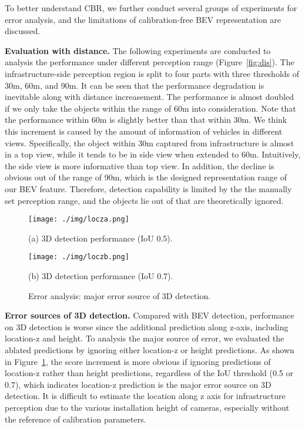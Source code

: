 \documentclass[letterpaper, 10 pt, conference]{ieeeconf}
\begin{document}
To better understand CBR, we further conduct several groups of experiments for error analysis, and the limitations of calibration-free BEV representation are discussed.

\textbf{Evaluation with distance.}
The following experiments are conducted to analysis the performance under different perception range (Figure~\ref{fig:dis}). The infrastructure-side perception region is split to four parts with three thresholds of 30m, 60m, and 90m. It can be seen that the performance degradation is inevitable along with distance increasement. The performance is almost doubled if we only take the objects within the range of 60m into consideration. Note that the performance within 60m is slightly better than that within 30m. We think this increment is caused by the amount of information of vehicles in different views. Specifically, the object within 30m captured from infrastructure is almost in a top view, while it tends to be in side view when extended to 60m. Intuitively, the side view is more informative than top view. 
In addition, the decline is obvious out of the range of 90m, which is the designed representation range of our BEV feature. Therefore, detection capability is limited by the the manually set perception range, and the objects lie out of that are theoretically ignored.

\begin{figure}
\footnotesize
\begin{minipage}[b]{1.0\linewidth}
  \centering
  \centerline{\texttt{[image: ./img/locza.png]}}
  \centerline{(a) 3D detection performance (IoU 0.5).}\medskip
\end{minipage}
 \vspace{1pt}
\begin{minipage}[b]{1.0\linewidth}
  \centering
  \centerline{\texttt{[image: ./img/loczb.png]}}
  \centerline{(b) 3D detection performance (IoU 0.7).}\medskip
\end{minipage}

\caption{Error analysis: major error source of 3D detection.}
\label{fig:source}
\end{figure}

\textbf{Error sources of 3D detection.}
Compared with BEV detection, performance on 3D detection is worse since the additional prediction along z-axis, including location-z and height. To analysis the major source of error, we evaluated the ablated predictions by ignoring either location-z or height predictions. As shown in Figure~\ref{fig:source}, the score increment is more obvious if ignoring predictions of location-z rather than height predictions, regardless of the IoU threshold (0.5 or 0.7), which indicates location-z prediction is the major error source on 3D detection. It is difficult to estimate the location along z axis for infrastructure perception due to the various installation height of cameras, especially without the reference of calibration parameters.
\end{document}
